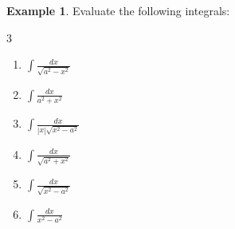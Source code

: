 \documentclass{book}
\theoremstyle{definition}
\newtheorem{example}{Example}[section]
\begin{document}
\begin{example}\label{ex:trignometric_substitution}
Evaluate the following integrals:
\begin{multicols}{3}
\begin{enumerate}[label=(\roman*)]
    \item $\displaystyle\int \frac{dx}{\sqrt{a^2-x^2}}$
    \item $\displaystyle\int \frac{dx}{{a^2+x^2}}$
    \item $\displaystyle\int \frac{dx}{|x|\sqrt{x^2-a^2}}$
    \item $\displaystyle\int \frac{dx}{\sqrt{a^2+x^2}}$
    \item $\displaystyle\int \frac{dx}{\sqrt{x^2-a^2}}$
    \item $\displaystyle\int\frac{dx}{x^2-a^2}$
\end{enumerate}
\end{multicols}    
\end{example}
\end{document}
